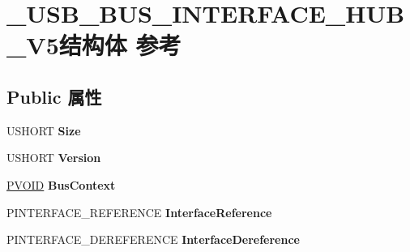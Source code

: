 \hypertarget{struct___u_s_b___b_u_s___i_n_t_e_r_f_a_c_e___h_u_b___v5}{}\section{\+\_\+\+U\+S\+B\+\_\+\+B\+U\+S\+\_\+\+I\+N\+T\+E\+R\+F\+A\+C\+E\+\_\+\+H\+U\+B\+\_\+\+V5结构体 参考}
\label{struct___u_s_b___b_u_s___i_n_t_e_r_f_a_c_e___h_u_b___v5}
\subsection*{Public 属性}
\begin{DoxyCompactItemize}
\item 
\mbox{\label{struct___u_s_b___b_u_s___i_n_t_e_r_f_a_c_e___h_u_b___v5_acc5a0d1721f5efbffcb3e3fc4230b321}} 
U\+S\+H\+O\+RT {\bfseries Size}
\item 
\mbox{\label{struct___u_s_b___b_u_s___i_n_t_e_r_f_a_c_e___h_u_b___v5_a9733e4ff4efbae5f1c505c9706925f44}} 
U\+S\+H\+O\+RT {\bfseries Version}
\item 
\mbox{\label{struct___u_s_b___b_u_s___i_n_t_e_r_f_a_c_e___h_u_b___v5_a59a2b3cf98de3a4266b770dd5efe9ca9}} 
\hyperlink{interfacevoid}{P\+V\+O\+ID} {\bfseries Bus\+Context}
\item 
\mbox{\label{struct___u_s_b___b_u_s___i_n_t_e_r_f_a_c_e___h_u_b___v5_ad21981d3eb87714d5c899ff749424d2d}} 
P\+I\+N\+T\+E\+R\+F\+A\+C\+E\+\_\+\+R\+E\+F\+E\+R\+E\+N\+CE {\bfseries Interface\+Reference}
\item 
\mbox{\label{struct___u_s_b___b_u_s___i_n_t_e_r_f_a_c_e___h_u_b___v5_a9d10019d2c1cd6c848d173ec0f2aaa67}} 
P\+I\+N\+T\+E\+R\+F\+A\+C\+E\+\_\+\+D\+E\+R\+E\+F\+E\+R\+E\+N\+CE {\bfseries Interface\+Dereference}
\item 
\mbox{\label{struct___u_s_b___b_u_s___i_n_t_e_r_f_a_c_e___h_u_b___v5_aa08231867d37d5fd8367958172ad86b8}} 

\end{DoxyCompactItemize}
